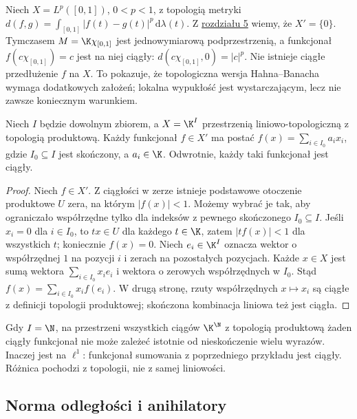 \begin{przyklad}
Niech $X=L^p([0,1])$, $0<p<1$, z topologią metryki
$d(f,g)=\int_{[0,1]}|f(t)-g(t)|^p\,\mathrm d\lambda(t)$.
Z \hyperref[sec:lokalnie-wypukle]{rozdziału 5} wiemy, że $X'=\{0\}$.
Tymczasem $M=\K\chi_{[0,1]}$ jest jednowymiarową
podprzestrzenią, a funkcjonał $f(c\chi_{[0,1]})=c$
jest na niej ciągły: $d(c\chi_{[0,1]},0)=|c|^p$.
Nie istnieje ciągłe przedłużenie $f$ na $X$.
To pokazuje, że topologiczna wersja Hahna--Banacha
wymaga dodatkowych założeń; lokalna wypukłość jest
wystarczającym, lecz nie zawsze koniecznym warunkiem.
\end{przyklad}

\begin{stwierdzenie}
\label{prop:product-dual}
Niech $I$ będzie dowolnym zbiorem, a $X=\K^I$
przestrzenią liniowo-topologiczną z topologią produktową.
Każdy funkcjonał $f\in X'$ ma postać
$f(x)=\sum_{i\in I_0}a_i x_i$, gdzie $I_0\subseteq I$
jest skończony, a $a_i\in\K$. Odwrotnie, każdy taki
funkcjonał jest ciągły.
\end{stwierdzenie}
\begin{proof}
Niech $f\in X'$. Z ciągłości w zerze istnieje
podstawowe otoczenie produktowe $U$ zera, na którym
$|f(x)|<1$. Możemy wybrać je tak, aby ograniczało
współrzędne tylko dla indeksów z pewnego skończonego
$I_0\subseteq I$. Jeśli $x_i=0$ dla $i\in I_0$,
to $tx\in U$ dla każdego $t\in\K$, zatem
$|t f(x)|<1$ dla wszystkich $t$; koniecznie $f(x)=0$.
Niech $e_i\in\K^I$ oznacza wektor o współrzędnej
$1$ na pozycji $i$ i zerach na pozostałych pozycjach.
Każde $x\in X$ jest sumą wektora
$\sum_{i\in I_0}x_i e_i$ i wektora o zerowych
współrzędnych w $I_0$. Stąd
$f(x)=\sum_{i\in I_0}x_i f(e_i)$.
W drugą stronę, rzuty współrzędnych $x\mapsto x_i$
są ciągłe z definicji topologii produktowej;
skończona kombinacja liniowa też jest ciągła.
\end{proof}

\begin{uwaga}
Gdy $I=\N$, na przestrzeni wszystkich ciągów
$\K^\N$ z topologią produktową żaden ciągły funkcjonał
nie może zależeć istotnie od nieskończenie wielu wyrazów.
Inaczej jest na $\ell^1$: funkcjonał sumowania z
poprzedniego przykładu jest ciągły.
Różnica pochodzi z topologii, nie z samej liniowości.
\end{uwaga}

\subsection{Norma odległości i anihilatory}

